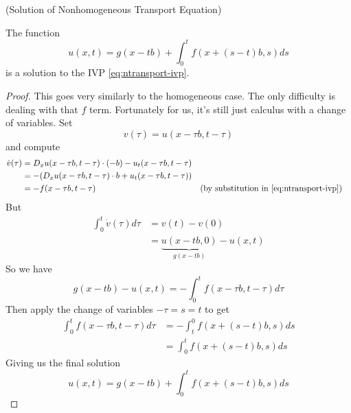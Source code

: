 \documentclass{bkcnotes}
\begin{document}
\begin{nthm}(Solution of Nonhomogeneous Transport Equation)

  The function
  \begin{equation}
    \label{eq:ntransport-sol}
    u(x,t) = g(x-tb) + \int_0^t f(x+(s-t)b,s)ds
  \end{equation}
  is a solution to the IVP \eqref{eq:ntransport-ivp}.
\end{nthm}
\begin{proof}
  This goes very similarly to the homogeneous case. The only
  difficulty is dealing with that $f$ term. Fortunately for us, it's
  still just calculus with a change of variables. Set
  \begin{equation}
    \label{eq:change-of-var}
    v(\tau) = u(x-\tau b,t-\tau)
  \end{equation}
  and compute
  \begin{equation}
    \label{eq:v-der}
    \begin{aligned}
      \dot{v}(\tau ) &= D_xu(x-\tau b,t-\tau)\cdot(-b) - u_t(x-\tau b,t-\tau) \\
      &= -(D_xu(x-\tau b,t-\tau)\cdot b + u_t(x-\tau b,t-\tau)) \\
      &= -f(x-\tau b,t-\tau) && \text{(by substitution in }
      \eqref{eq:ntransport-ivp})
    \end{aligned}
  \end{equation}
  But
  \begin{equation}
    \label{eq:v-int}
    \begin{aligned}
      \int_0^t \dot{v}(\tau) d\tau &= v(t) - v(0) \\
      &= \underbrace{u(x - tb,0)}_{g(x-tb)} - u(x,t)
    \end{aligned}
  \end{equation}
  So we have
  \begin{equation}
    g(x-tb) - u(x,t) = -\int_0^t f(x-\tau b, t - \tau)d\tau 
  \end{equation}
  Then apply the change of variables $-\tau = s = t$ to get
  \begin{equation}
    \begin{aligned}
      \int_0^t f(x-\tau b, t-\tau)d\tau &= -\int_t^0 f(x + (s-t)b,s)ds \\
      &= \int_0^t f(x+(s-t)b,s)ds
    \end{aligned}
  \end{equation}
  Giving us the final solution
  \begin{equation}
    \label{eq:nhom-sol}
    u(x,t) = g(x-tb) + \int_0^t f(x+(s-t)b,s)ds
  \end{equation}
\end{proof}
\end{document}
